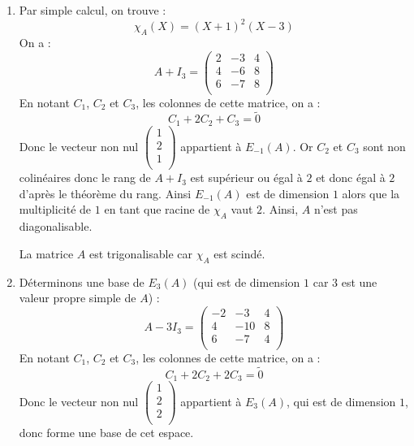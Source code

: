\documentclass[a4paper,10pt]{report}
\begin{document}
\begin{enumerate}
\item Par simple calcul, on trouve :
$$ \chi_A(X) = (X+1)^2(X-3)$$
On a :
$$ A+I_3 =  \begin{pmatrix}
2 & -3 & 4 \\
4 & -6 & 8 \\
6 & -7 & 8 \\
\end{pmatrix}$$
En notant $C_1$, $C_2$ et $C_3$, les colonnes de cette matrice, on a :
$$ C_1+2C_2+C_3= \tilde{0}$$
Donc le vecteur non nul $\begin{pmatrix}
1 \\
2 \\
1 \\
\end{pmatrix}$ appartient à $E_{-1}(A)$. Or $C_2$ et $C_3$ sont non colinéaires donc le rang de $A+I_3$ est supérieur ou égal à $2$ et donc égal à $2$ d'après le théorème du rang. Ainsi $E_{-1}(A)$ est de dimension $1$ alors que la multiplicité de $1$ en tant que racine de $\chi_A$ vaut $2$. Ainsi, $A$ n'est pas diagonalisable.

\medskip

\noindent La matrice $A$ est trigonalisable car $\chi_A$ est scindé.
\item Déterminons une base de $E_3(A)$ (qui est de dimension $1$ car $3$ est une valeur propre simple de $A$) :
$$ A- 3I_3 = \begin{pmatrix}
-2 & -3 & 4 \\
4 & -10 & 8 \\
6 & -7 & 4 \\
\end{pmatrix}$$
En notant $C_1$, $C_2$ et $C_3$, les colonnes de cette matrice, on a :
$$ C_1+2C_2+2C_3= \tilde{0}$$
Donc le vecteur non nul $\begin{pmatrix}
1 \\
2 \\
2 \\
\end{pmatrix}$ appartient à $E_{3}(A)$, qui est de dimension $1$, donc forme une base de cet espace. 

\medskip


\end{enumerate}
\end{document}
